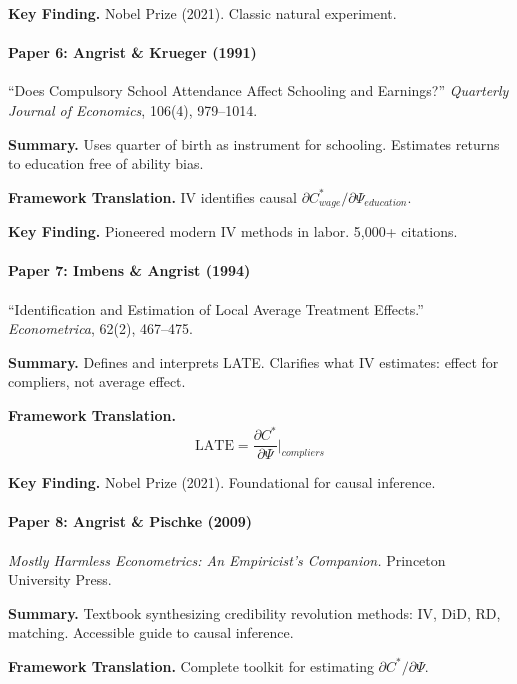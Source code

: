 \textbf{Key Finding.}
Nobel Prize (2021). Classic natural experiment.

\paragraph{Paper 6: Angrist \& Krueger (1991)}

``Does Compulsory School Attendance Affect Schooling and Earnings?''
\textit{Quarterly Journal of Economics}, 106(4), 979--1014.

\textbf{Summary.}
Uses quarter of birth as instrument for schooling. Estimates returns to 
education free of ability bias.

\textbf{Framework Translation.}
IV identifies causal $\partial C^*_{wage}/\partial \Psi_{education}$.

\textbf{Key Finding.}
Pioneered modern IV methods in labor. 5,000+ citations.

\paragraph{Paper 7: Imbens \& Angrist (1994)}

``Identification and Estimation of Local Average Treatment Effects.''
\textit{Econometrica}, 62(2), 467--475.

\textbf{Summary.}
Defines and interprets LATE. Clarifies what IV estimates: effect for 
compliers, not average effect.

\textbf{Framework Translation.}
\begin{equation}
\text{LATE} = \frac{\partial C^*}{\partial \Psi}\bigg|_{compliers}
\end{equation}

\textbf{Key Finding.}
Nobel Prize (2021). Foundational for causal inference.

\paragraph{Paper 8: Angrist \& Pischke (2009)}

\textit{Mostly Harmless Econometrics: An Empiricist's Companion.}
Princeton University Press.

\textbf{Summary.}
Textbook synthesizing credibility revolution methods: IV, DiD, RD, 
matching. Accessible guide to causal inference.

\textbf{Framework Translation.}
Complete toolkit for estimating $\partial C^*/\partial \Psi$.

